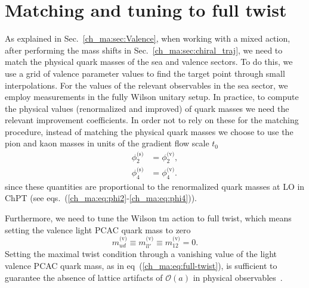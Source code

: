 

\section{Matching and tuning to full twist}
\label{ch_ma:sec:matching}

As explained in Sec.~\ref{ch_ma:sec:Valence}, when working with a mixed action, after performing the mass shifts in Sec.~\ref{ch_ma:sec:chiral_traj}, we need to match the physical quark masses of the sea and valence sectors. To do this, we use a grid of valence parameter values to find the target point through small interpolations. For the values of the relevant observables in the sea sector, we employ measurements in the fully Wilson unitary setup. In practice, to compute the physical values (renormalized and improved) of quark masses we need the relevant improvement coefficients. In order not to rely on these for the matching procedure, instead of matching the physical quark masses we choose to use the pion and kaon masses in units of the gradient flow scale $t_0$
\begin{align}
\label{ch_ma:eq:matching}
\phi_2^{\textrm{(s)}}&=\phi_2^{\textrm{(v)}},\\
\phi_4^{\textrm{(s)}}&=\phi_4^{\textrm{(v)}}.
\end{align}
since these quantities are proportional to the renormalized quark masses at LO in ChPT (see eqs.~(\ref{ch_ma:eq:phi2}-\ref{ch_ma:eq:phi4})).

Furthermore, we need to tune the Wilson tm action to full twist, which means setting the valence light PCAC quark mass to zero
\begin{equation}
\label{ch_ma:eq:full-twist}
m_{ud}^{\textrm{(v)}}\equiv m_{ll'}^{\textrm{(v)}}\equiv m_{12}^{\textrm{(v)}}=0.
\end{equation}
Setting the maximal twist condition through a vanishing value of the light valence PCAC quark mass, as in eq~(\ref{ch_ma:eq:full-twist}), is sufficient to guarantee the absence of lattice artifacts of $\mathcal{O}(a)$ in physical observables~\citep{Frezzotti:2003ni, ETM:2008zte}. 

